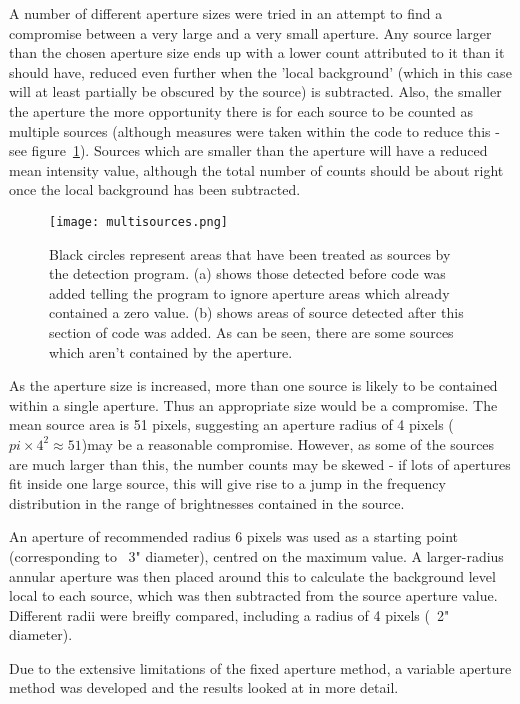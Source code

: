 \documentclass[a4paper,11pt,twoside]{article}
\begin{document}
A number of different aperture sizes were tried in an attempt to 
find a compromise between a very large and a very small 
aperture. Any source larger than the chosen aperture size ends up 
with a lower count attributed to it than it should have, reduced 
even further when the 'local background' (which in this case will 
at least partially be obscured by the source) is subtracted. Also, 
the smaller the aperture the more opportunity there is for each source 
to be counted as multiple sources (although measures were taken within 
the code to reduce this - see figure~\ref{fig:multisources}). 
Sources which are smaller than the aperture will have a 
reduced mean intensity value, although the total number of counts 
should be about right once the local background has been subtracted. 

\begin{figure}[htb]
  \centering
  \texttt{[image: multisources.png]}
  \caption{Black circles represent areas that have been treated as 
sources by the detection program. (a) shows those detected before 
code was added telling the program to ignore aperture areas which 
already contained a zero value. (b) shows areas of source detected 
after this section of code was added. As can be seen, there are some 
sources which aren't contained by the aperture.}
  \label{fig:multisources}
\end{figure}

As the aperture size is increased, more than one source is likely 
to be contained within a single aperture. Thus an appropriate size 
would be a compromise. The mean source area is 51 pixels, suggesting 
an aperture radius of 4 pixels (\(pi \times 4^2 \approx 51\))may be a 
reasonable compromise. However, as some of the sources are much larger 
than this, the number counts may be skewed - if lots of apertures 
fit inside one large source, this will give rise to a jump in the 
frequency distribution in the range of brightnesses contained in the 
source.

An aperture of recommended radius 6 pixels\cite{clem} was used as 
a starting point (corresponding to ~3" diameter), centred on the maximum 
value. A larger-radius annular aperture was then placed around 
this to calculate the background level local to each source, which 
was then subtracted from the source aperture value. 
Different radii were breifly compared, including a radius of 4 pixels 
(~2" diameter).

Due to the extensive limitations of the fixed aperture method, a variable 
aperture method was developed and the results looked at in more detail.
\end{document}
